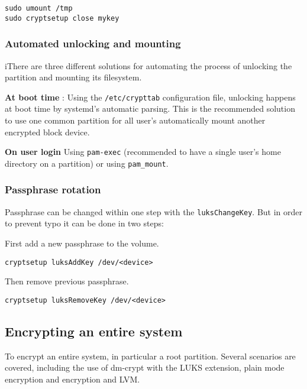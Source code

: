 \begin{verbatim}
sudo umount /tmp
sudo cryptsetup close mykey
\end{verbatim}

\subsubsection{Automated unlocking and mounting}
iThere are three different solutions for automating the process of unlocking
the partition and mounting its filesystem.

{\bf At boot time} : Using the \verb+/etc/crypttab+ configuration file,
unlocking happens at boot time by systemd's automatic parsing. This is the
recommended solution to use one common partition for all user's automatically
mount another encrypted block device.

{\bf On user login} Using \verb+pam-exec+ (recommended to have a single user's
home directory on a partition) or using \verb+pam_mount+.

\subsubsection{Passphrase rotation}
Passphrase can be changed within one step with the \verb+luksChangeKey+. But in
order to prevent typo it can be done in two steps:

First add a new passphrase to the volume.
\begin{verbatim}
cryptsetup luksAddKey /dev/<device>
\end{verbatim}

Then remove previous passphrase.
\begin{verbatim}
cryptsetup luksRemoveKey /dev/<device>
\end{verbatim}


\subsection{Encrypting an entire system}
To encrypt an entire system, in particular a root partition. Several scenarios
are covered, including the use of dm-crypt with the LUKS extension, plain mode
encryption and encryption and LVM.

